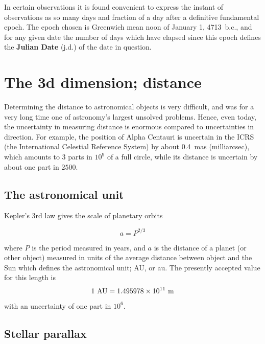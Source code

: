 In certain observations it is found convenient to express the instant of observations
as so many days and fraction of a day after a definitive fundamental epoch. The epoch
chosen is Greenwich mean noon of January 1, 4713~{\sc b.c.}, and for any given date the
number of days which have elapsed since this epoch defines the {\bf Julian Date} 
({\sc j.d.}) of the date in question.

\section{The 3d dimension; distance}

Determining the distance to astronomical objects is very difficult, and was for a very
long time one of astronomy's largest unsolved problems. Hence, even today, the uncertainty 
in measuring distance is enormous compared to uncertainties in direction. For example,
the position of Alpha Centauri is uncertain in the ICRS (the International Celestial Reference
System) by about 0.4~mas (milliarcsec), which amounts to 3 parts in $10^9$ of a full circle, while
its distance is uncertain by about one part in $2500$. 

\subsection{The astronomical unit}

Kepler's 3rd law gives the scale of planetary orbits

\[ a=P^{2/3} \]

where $P$ is the period measured in years, and $a$ is the distance of a planet (or other object) 
measured in units of the average distance between object and the Sun which defines the 
astronomical unit; AU, or au. The presently accepted value for this length is
\[ 1~{\rm AU}=1.495978\times 10^{11}~{\rm m} \]
with an uncertainty of one part in $10^6$.

\subsection{Stellar parallax}

